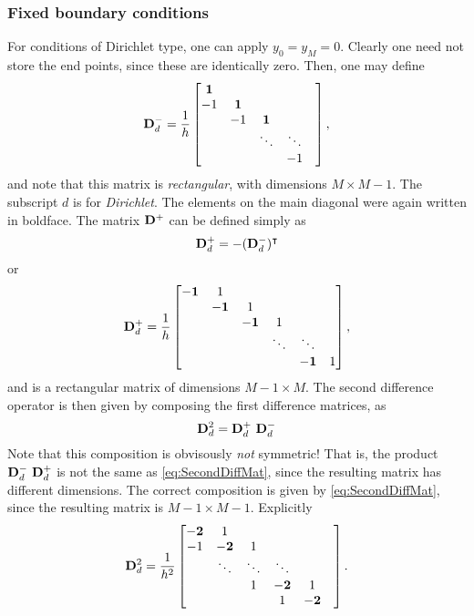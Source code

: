 \documentclass[11pt,twoside,a4paper,english]{book}
\begin{document}
\subsubsection{Fixed boundary conditions}
For conditions of Dirichlet type, one can apply $y_0=y_M=0$. Clearly one need not store the end points, since these are identically zero. Then, one may define
\begin{equation}
{\bf D}^-_d  = \frac{1}{h}\begin{bmatrix}
{\bf 1} &  &   &   \\ 
-1& {\bf 1} & & &    \\
&-1 & {\bf 1} & &    \\
& & \ddots & \ddots &    \\
& &  & -1&   
\end{bmatrix},
\end{equation}
and note that this matrix is \emph{rectangular}, with dimensions $M \times M-1$. The subscript $d$ is for \emph{Dirichlet}. The elements on the main diagonal were again written in boldface. The matrix ${\bf D}^{+}$ can be defined simply as
\begin{equation}
{\bf D}^+_{d} = -({\bf D}^-_d)^\intercal
\end{equation}
or
\begin{equation}
{\bf D}^+_d  = \frac{1}{h}\begin{bmatrix}
{\bf -1} &  1 &   &   &\\ 
& {\bf -1} & 1 & &  &  \\
& & {\bf -1} & 1&   & \\
& & & \ddots &  \ddots & \\
& & &  & {\bf -1}&   1
\end{bmatrix},
\end{equation}
and is a rectangular matrix of dimensions $M-1 \times M$. The second difference operator is then given by composing the first difference matrices, as
\begin{equation}\label{eq:SecondDiffMat}
{\bf D}^2_d = {\bf D}^+_d \,\, {\bf D}^-_d
\end{equation}
Note that this composition is obvisously \emph{not} symmetric! That is, the product ${\bf D}^-_d \,\, {\bf D}^+_d$ is not the same as \eqref{eq:SecondDiffMat}, since the resulting matrix has different dimensions. The correct composition is given by \eqref{eq:SecondDiffMat}, since the resulting matrix is $M-1 \times M-1$. Explicitly
\begin{equation}\label{eq:D2Diri}
{\bf D}^2_d = \frac{1}{h^2}\begin{bmatrix}
{\bf -2}& 1&   &  &  &  \\ 
-1& {\bf -2} & 1 &  &  &\\
& \ddots & \ddots & \ddots &  &      \\
& &  1 & {\bf -2}& 1   \\
& &   & 1 & {\bf -2}   \\
\end{bmatrix}.
\end{equation}
\end{document}
